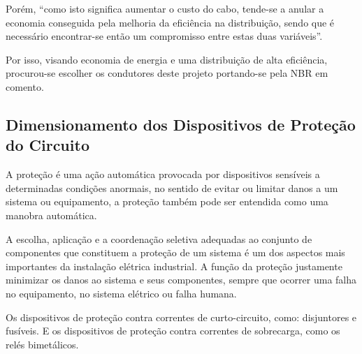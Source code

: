 Porém, “como isto significa aumentar o custo do cabo, tende-se a anular a economia conseguida pela melhoria da eficiência na distribuição, sendo que é necessário encontrar-se então um compromisso entre estas duas variáveis”.

Por isso, visando economia de energia e uma distribuição de alta eficiência, procurou-se escolher os condutores deste projeto portando-se pela NBR em comento.

\subsection{Dimensionamento dos Dispositivos de Proteção do Circuito}

A proteção é uma ação automática provocada por dispositivos sensíveis a determinadas condições anormais, no sentido de evitar ou limitar danos a um sistema ou equipamento, a proteção também pode ser entendida como uma manobra automática.

A escolha, aplicação e a coordenação seletiva adequadas ao conjunto de componentes que constituem a proteção de um sistema é um dos aspectos mais importantes da instalação elétrica industrial. A função da proteção justamente minimizar os danos ao sistema e seus componentes, sempre que ocorrer uma falha no equipamento, no sistema elétrico ou falha humana.

Os dispositivos de proteção contra correntes de curto-circuito, como: disjuntores e fusíveis. E os dispositivos de proteção contra correntes de sobrecarga, como os relés bimetálicos.